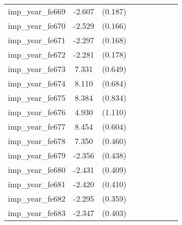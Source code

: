 {\begin{tabular}{l*{4}{cc}}
imp\_year\_fe669&   -2.607\sym{***}&  (0.187)&                  &         &                  &         &                  &         \\
imp\_year\_fe670&   -2.529\sym{***}&  (0.166)&                  &         &                  &         &                  &         \\
imp\_year\_fe671&   -2.297\sym{***}&  (0.168)&                  &         &                  &         &                  &         \\
imp\_year\_fe672&   -2.281\sym{***}&  (0.178)&                  &         &                  &         &                  &         \\
imp\_year\_fe673&    7.331\sym{***}&  (0.649)&                  &         &                  &         &                  &         \\
imp\_year\_fe674&    8.110\sym{***}&  (0.684)&                  &         &                  &         &                  &         \\
imp\_year\_fe675&    8.384\sym{***}&  (0.834)&                  &         &                  &         &                  &         \\
imp\_year\_fe676&    4.930\sym{***}&  (1.110)&                  &         &                  &         &                  &         \\
imp\_year\_fe677&    8.454\sym{***}&  (0.604)&                  &         &                  &         &                  &         \\
imp\_year\_fe678&    7.350\sym{***}&  (0.460)&                  &         &                  &         &                  &         \\
imp\_year\_fe679&   -2.356\sym{***}&  (0.438)&                  &         &                  &         &                  &         \\
imp\_year\_fe680&   -2.431\sym{***}&  (0.409)&                  &         &                  &         &                  &         \\
imp\_year\_fe681&   -2.420\sym{***}&  (0.410)&                  &         &                  &         &                  &         \\
imp\_year\_fe682&   -2.295\sym{***}&  (0.359)&                  &         &                  &         &                  &         \\
imp\_year\_fe683&   -2.347\sym{***}&  (0.403)&                  &         &                  &         &                  &         \\

\end{tabular}}
